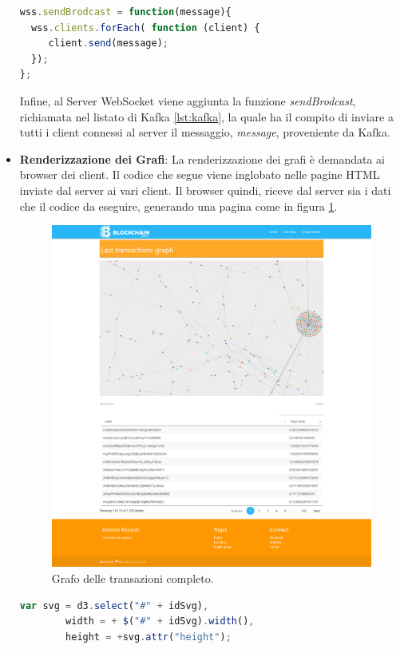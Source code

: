 \begin{itemize}
\begin{lstlisting}[language=Javascript, label=lst:websocket, caption={Creazione di un Server WebSocket.}]
wss.sendBrodcast = function(message){
  wss.clients.forEach( function (client) {
     client.send(message);
  });
};
\end{lstlisting}

Infine, al Server WebSocket viene aggiunta la funzione \textit{sendBrodcast}, richiamata nel listato di Kafka \ref{lst:kafka}, la quale ha il compito di inviare a tutti i client connessi al server il messaggio, \textit{message}, proveniente da Kafka.

\item \textbf{Renderizzazione dei Grafi}: La renderizzazione dei grafi è demandata ai browser dei client. Il codice che segue viene inglobato nelle pagine HTML inviate dal server ai vari client. Il browser quindi, riceve dal server sia i dati che il codice da eseguire, generando una pagina come in figura \ref{fig:graphView}.

\begin{figure}[H]
	\centering
	\includegraphics[width=\textwidth, height=0.65\textheight]{images/graphView.png}
	\caption{Grafo delle transazioni completo.}
	\label{fig:graphView}
\end{figure}

\begin{lstlisting}[language=Javascript, label=lst:intGraph, caption={Inizializzazione svg per il grafo.}]
var svg = d3.select("#" + idSvg),
        width = + $("#" + idSvg).width(),
        height = +svg.attr("height");


\end{lstlisting}
\end{itemize}
